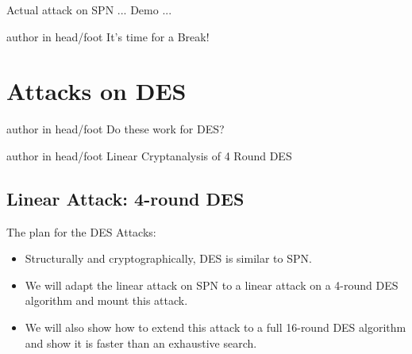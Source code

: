 \documentclass[9pt]{beamer}
\begin{document}
\begin{frame}
Actual attack on SPN ... Demo ...
\end{frame}

\begin{frame}
\begin{beamercolorbox}[ht=2.5ex,dp=1.125ex,center,rounded=true,shadow=true]{author in head/foot}
It's time for a Break!
\end{beamercolorbox}
\end{frame}


\section{Attacks on DES}
\begin{frame}
\begin{beamercolorbox}[ht=2.5ex,dp=1.125ex,center,rounded=true,shadow=true]{author in head/foot}
Do these work for DES?
\end{beamercolorbox}
\end{frame}

\begin{frame}
\begin{beamercolorbox}[ht=2.5ex,dp=1.125ex,center,rounded=true,shadow=true]{author in head/foot}
Linear Cryptanalysis of 4 Round DES
\end{beamercolorbox}
\end{frame}

\subsection{Linear Attack: 4-round DES}
\begin{frame}
The plan for the DES Attacks:
\begin{itemize}[<+->]
\item{Structurally and cryptographically, DES is similar to SPN.}
\item{We will adapt the linear attack on SPN to a linear attack on a 4-round DES algorithm and mount this attack.}
\item{We will also show how to extend this attack to a full 16-round DES algorithm and show it is faster than an exhaustive search.}
\end{itemize}
\end{frame}
\end{document}
